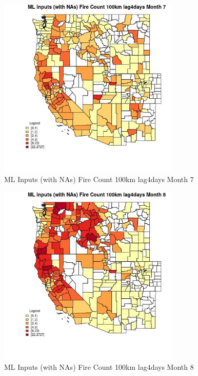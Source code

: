 \begin{figure} 
\centering  
\includegraphics[width=0.77\textwidth]{Code_Outputs/Report_ML_input_PM25_Step4_part_f_de_duplicated_aveswNAs_CountyFire_Count_100km_lag4daysmedianMonth7.jpg} 
\caption{\label{fig:Report_ML_input_PM25_Step4_part_f_de_duplicated_aveswNAsCountyFire_Count_100km_lag4daysmedianMonth7}ML Inputs (with NAs) Fire Count 100km lag4days Month 7} 
\end{figure} 
 

\begin{figure} 
\centering  
\includegraphics[width=0.77\textwidth]{Code_Outputs/Report_ML_input_PM25_Step4_part_f_de_duplicated_aveswNAs_CountyFire_Count_100km_lag4daysmedianMonth8.jpg} 
\caption{\label{fig:Report_ML_input_PM25_Step4_part_f_de_duplicated_aveswNAsCountyFire_Count_100km_lag4daysmedianMonth8}ML Inputs (with NAs) Fire Count 100km lag4days Month 8} 
\end{figure} 
 

